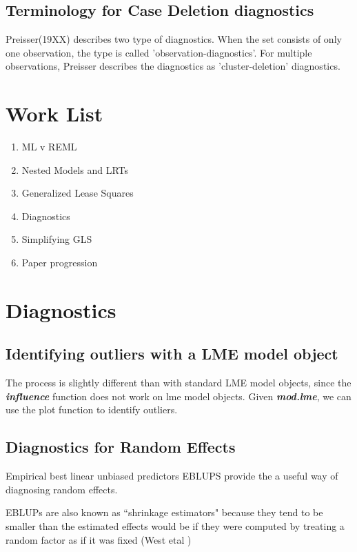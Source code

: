 \documentclass[12pt, a4paper]{report}
\begin{document}
\subsection{Terminology for Case Deletion diagnostics} %
Preisser(19XX) describes two type of diagnostics. When the set consists of only one observation, the type is called
'observation-diagnostics'. For multiple observations, Preisser describes the diagnostics as 'cluster-deletion' diagnostics.

\section{Work List}
\begin{enumerate}
	\item ML v REML
	\item Nested Models and LRTs
	\item Generalized Lease Squares
	\item Diagnostics
	\item Simplifying GLS
	\item Paper progression
\end{enumerate}





\newpage
\section{Diagnostics}

\subsection{Identifying outliers with a LME model object}

The process is slightly different than with standard LME model objects, since the \textbf{\emph{influence}}
function does not work on lme model objects. Given \textbf{\emph{mod.lme}}, we can use the plot function to
identify outliers.
\subsection{Diagnostics for Random Effects}
Empirical best linear unbiased predictors EBLUPS provide the a useful way of diagnosing random effects.

EBLUPs are also known as ``shrinkage estimators" because they tend to be smaller than the estimated effects would be if they were computed by treating a random factor as if it was fixed (West etal )
\end{document}
